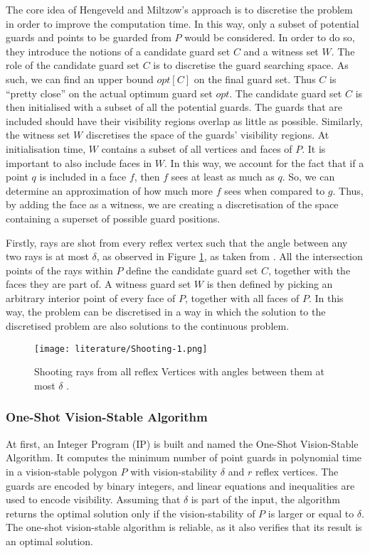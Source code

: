 The core idea of Hengeveld and Miltzow's approach is to discretise the problem in order to improve the computation time. In this way, only a subset of potential guards and points to be guarded from $P$ would be considered. In order to do so, they introduce the notions of a candidate guard set $C$ and a witness set $W$. The role of the candidate guard set $C$ is to discretise the guard searching space. As such, we can find an upper bound $opt[C]$ on the final guard set. Thus $C$ is ``pretty close'' on the actual optimum guard set $opt$. The candidate guard set $C$ is then initialised with a subset of all the potential guards. The guards that are included should have their visibility regions overlap as little as possible. Similarly, the witness set $W$ discretises the space of the guards' visibility regions. At initialisation time, $W$ contains a subset of all vertices and faces of $P$. It is important to also include faces in $W$. In this way, we account for the fact that if a point $q$ is included in a face $f$, then $f$ sees at least as much as $q$. So, we can determine an approximation of how much more $f$ sees when compared to $g$. Thus, by adding the face as a witness, we are creating a discretisation of the space containing a superset of possible guard positions.

Firstly, rays are shot from every reflex vertex such that the angle between any two rays is at most $\delta$, as observed in Figure \ref{fig:rays}, as taken from \cite{DBLP:journals/corr/abs-2007-06920}. All the intersection points of the rays within $P$ define the candidate guard set $C$, together with the faces they are part of. A witness guard set $W$ is then defined by picking an arbitrary interior point of every face of $P$, together with all faces of $P$. In this way, the problem can be discretised in a way in which the solution to the discretised problem are also solutions to the continuous problem.

\begin{figure}[h!]
    \centering
    \texttt{[image: literature/Shooting-1.png]}
    \caption{Shooting rays from all reflex Vertices with angles between them at most $\delta$ \cite{DBLP:journals/corr/abs-2007-06920}.}
    \label{fig:rays}
\end{figure}

\newpage
\subsubsection{One-Shot Vision-Stable Algorithm}
At first, an Integer Program (IP) is built and named the One-Shot Vision-Stable Algorithm. It computes the minimum number of point guards in polynomial time in a vision-stable polygon $P$ with  vision-stability $\delta$ and $r$ reflex vertices. The guards are encoded by binary integers, and linear equations and inequalities are used to encode visibility. Assuming that $\delta$ is part of the input, the algorithm returns the optimal solution only if the vision-stability of $P$ is larger or equal to $\delta$. The one-shot vision-stable algorithm is reliable, as it also verifies that its result is an optimal solution. 

